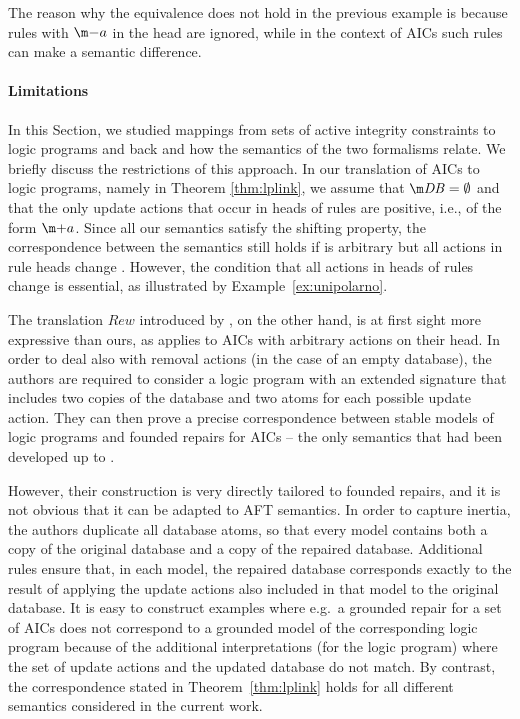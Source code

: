 The reason why the equivalence does not hold in the previous example is because rules with $\remove a$ in the head are ignored, while in the context of AICs such rules can make a semantic difference. 

\paragraph{Limitations}
In this Section, we studied mappings from sets of active integrity constraints to logic programs and back and how the semantics of the two formalisms relate. 
We briefly discuss the restrictions of this approach. 
In our translation of AICs to logic programs, namely in Theorem \ref{thm:lplink}, we assume that $\db=\emptyset$ and that the only update actions that occur in heads of rules are positive, i.e., of the form $\add a$. 
Since all our semantics satisfy the shifting property, the correspondence between the semantics still holds if \db is arbitrary but all actions in rule heads change \db. 
However, the condition that all actions in heads of rules change \db is essential,
as illustrated by Example~\ref{ex:unipolarno}.

The translation $\mathit{Rew}$ introduced by \citet{iclp/CaropreseGSZ06}, on the other hand, is at first sight more expressive than ours, as applies to AICs with arbitrary actions on their head.
In order to deal also with removal actions (in the case of an empty database), the authors are required to consider a logic program with an extended signature that includes two copies of the database and two atoms for each possible update action.
They can then prove a precise correspondence between stable models of logic programs and founded repairs for AICs -- the only semantics that had been developed up to \cite{iclp/CaropreseGSZ06}.

However, their construction is very directly tailored to founded repairs, and it is not obvious that it can be adapted to AFT semantics.
In order to capture inertia, the authors duplicate all database atoms, so that every model contains both a copy of the original database and a copy of the repaired database.
Additional rules ensure that, in each model, the repaired database corresponds exactly to the result of applying the update actions also included in that model to the original database.
It is easy to construct examples where e.g.~a grounded repair for a set of AICs does not correspond to a grounded model of the corresponding logic program because of the additional interpretations (for the logic program) where the set of update actions and the updated database do not match.
By contrast, the correspondence stated in Theorem~\ref{thm:lplink} holds for all different semantics considered in the current work.

